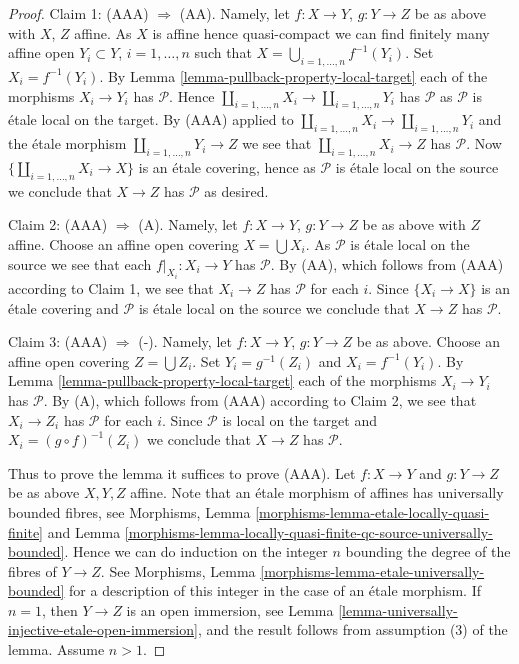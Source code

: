\begin{proof}
\medskip\noindent
Claim 1: (AAA) $\Rightarrow$ (AA).
Namely, let $f : X \to Y$, $g : Y \to Z$ be as above with $X$, $Z$ affine.
As $X$ is affine hence quasi-compact we can find finitely many
affine open $Y_i \subset Y$, $i = 1, \ldots, n$ such that
$X = \bigcup_{i = 1, \ldots, n} f^{-1}(Y_i)$. Set $X_i = f^{-1}(Y_i)$. By
Lemma \ref{lemma-pullback-property-local-target}
each of the morphisms $X_i \to Y_i$ has $\mathcal{P}$.
Hence $\coprod_{i = 1, \ldots, n} X_i \to \coprod_{i = 1, \ldots, n} Y_i$
has $\mathcal{P}$ as $\mathcal{P}$ is \'etale local on the target.
By (AAA) applied to
$\coprod_{i = 1, \ldots, n} X_i \to \coprod_{i = 1, \ldots, n} Y_i$
and the \'etale morphism $\coprod_{i = 1, \ldots, n} Y_i \to Z$
we see that $\coprod_{i = 1, \ldots, n} X_i \to Z$ has $\mathcal{P}$.
Now $\{\coprod_{i = 1, \ldots, n} X_i \to X\}$ is an \'etale
covering, hence as $\mathcal{P}$ is \'etale local on the source
we conclude that $X \to Z$ has $\mathcal{P}$ as desired.

\medskip\noindent
Claim 2: (AAA) $\Rightarrow$ (A).
Namely, let $f : X \to Y$, $g : Y \to Z$ be as above with $Z$ affine.
Choose an affine open covering $X = \bigcup X_i$.
As $\mathcal{P}$ is \'etale local on the source we see that
each $f|_{X_i} : X_i \to Y$ has $\mathcal{P}$.
By (AA), which follows from (AAA) according to Claim 1, we see that
$X_i \to Z$ has $\mathcal{P}$ for each $i$.
Since $\{X_i \to X\}$ is an \'etale covering and $\mathcal{P}$ is \'etale
local on the source we conclude that
$X \to Z$ has $\mathcal{P}$.

\medskip\noindent
Claim 3: (AAA) $\Rightarrow$ (-).
Namely, let $f : X \to Y$, $g : Y \to Z$ be as above.
Choose an affine open covering $Z = \bigcup Z_i$.
Set $Y_i = g^{-1}(Z_i)$ and $X_i = f^{-1}(Y_i)$. By
Lemma \ref{lemma-pullback-property-local-target}
each of the morphisms $X_i \to Y_i$ has $\mathcal{P}$.
By (A), which follows from (AAA) according to Claim 2, we see that
$X_i \to Z_i$ has $\mathcal{P}$ for each $i$.
Since $\mathcal{P}$ is local on the target and $X_i = (g \circ f)^{-1}(Z_i)$
we conclude that $X \to Z$ has $\mathcal{P}$.

\medskip\noindent
Thus to prove the lemma it suffices to prove (AAA).
Let $f : X \to Y$ and $g : Y \to Z$ be as above $X, Y, Z$ affine.
Note that an \'etale morphism of affines has universally bounded fibres, see
Morphisms,
Lemma \ref{morphisms-lemma-etale-locally-quasi-finite} and
Lemma \ref{morphisms-lemma-locally-quasi-finite-qc-source-universally-bounded}.
Hence we can do induction on the integer $n$ bounding the degree of the fibres
of $Y \to Z$. See
Morphisms, Lemma \ref{morphisms-lemma-etale-universally-bounded}
for a description of this integer in the case of an \'etale morphism.
If $n = 1$, then $Y \to Z$ is an open immersion, see
Lemma \ref{lemma-universally-injective-etale-open-immersion},
and the result follows from assumption (3) of the lemma. Assume $n > 1$.


\end{proof}
